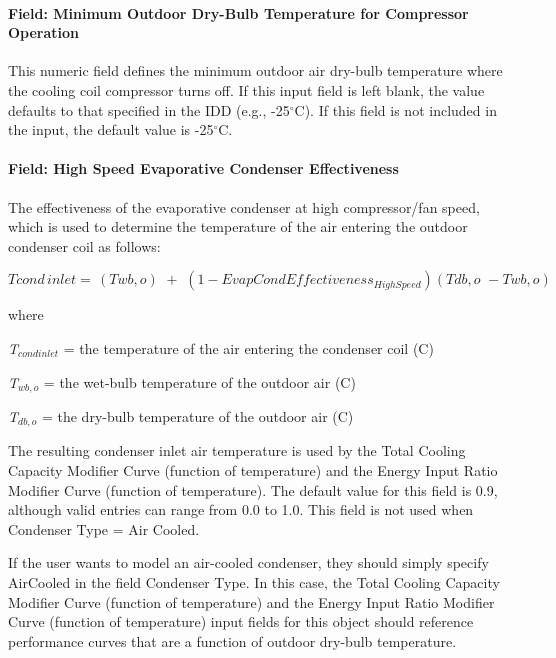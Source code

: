 \paragraph{Field: Minimum Outdoor Dry-Bulb Temperature for Compressor Operation}

This numeric field defines the minimum outdoor air dry-bulb temperature where the cooling coil compressor turns off. If this input field is left blank, the value defaults to that specified in the IDD (e.g., -25$^\circ$C). If this field is not included in the input, the default value is -25$^\circ$C.

\paragraph{Field: High Speed Evaporative Condenser Effectiveness}\label{field-high-speed-evaporative-condenser-effectiveness}

The effectiveness of the evaporative condenser at high compressor/fan speed, which is used to determine the temperature of the air entering the outdoor condenser coil as follows:

\begin{equation}
Tcond\,inlet = \,\left( {Twb,o} \right)\,\, + \,\,\left( {1 - EvapCondEffectivenes{s_{HighSpeed}}} \right)\left( {Tdb,o\,\, - Twb,o} \right)
\end{equation}

where

\emph{T\(_{cond inlet}\)} = the temperature of the air entering the condenser coil (C)

\emph{T\(_{wb,o}\)} = the wet-bulb temperature of the outdoor air (C)

\emph{T\(_{db,o}\)} = the dry-bulb temperature of the outdoor air (C)

The resulting condenser inlet air temperature is used by the Total Cooling Capacity Modifier Curve (function of temperature) and the Energy Input Ratio Modifier Curve (function of temperature). The default value for this field is 0.9, although valid entries can range from 0.0 to 1.0. This field is not used when Condenser Type = Air Cooled.

If the user wants to model an air-cooled condenser, they should simply specify AirCooled in the field Condenser Type. In this case, the Total Cooling Capacity Modifier Curve (function of temperature) and the Energy Input Ratio Modifier Curve (function of temperature) input fields for this object should reference performance curves that are a function of outdoor dry-bulb temperature.

